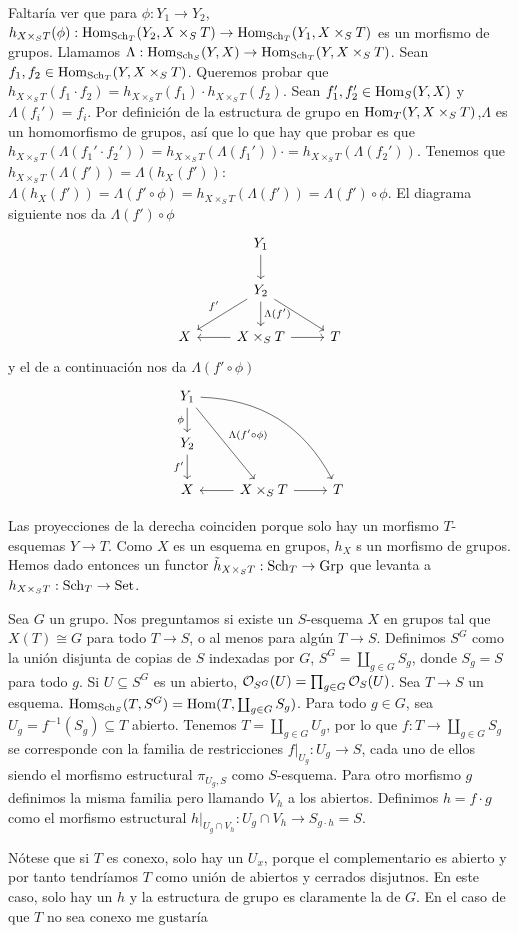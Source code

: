 \documentclass[GA.tex]{subfiles}
\begin{document}
Faltaría ver que para $\phi:Y_1\to Y_2$, $h_{X\times_S T}(\phi):\operatorname{Hom}_{\operatorname{Sch}_T}(Y_2,X\times_S T)\to\operatorname{Hom}_{\operatorname{Sch}_T}(Y_1,X\times_S T)$ es un morfismo de grupos. 
Llamamos $\Lambda:\operatorname{Hom}_{\operatorname{Sch}_S}(Y,X)\to\operatorname{Hom}_{\operatorname{Sch}_T}(Y,X\times_S T)$. Sean $f_1,f_2\in\operatorname{Hom}_{\operatorname{Sch}_T}(Y,X\times_S T)$. Queremos probar que $h_{X\times_S T}(f_1\cdot f_2)=h_{X\times_S T}(f_1)\cdot h_{X\times_S T}(f_2)$. Sean $f_1',f_2'\in\operatorname{Hom}_S(Y,X)$ y $\Lambda(f_i')=f_i$. Por definición de la estructura de grupo en $\operatorname{Hom}_T(Y,X\times_S T)$,$\Lambda$ es un homomorfismo de grupos, así que lo que hay que probar es que $h_{X\times_S T}(\Lambda(f_1'\cdot f_2'))=h_{X\times_S T}(\Lambda(f_1'))\cdot=h_{X\times_S T}(\Lambda(f_2'))$. Tenemos que $h_{X\times_S T}(\Lambda(f'))=\Lambda(h_X(f'))$: $\Lambda(h_X(f'))=\Lambda(f'\circ\phi)=h_{X\times_S T}(\Lambda(f'))=\Lambda(f')\circ\phi$. El diagrama siguiente nos da $\Lambda(f')\circ\phi$
\[
\begin{tikzcd}
 & Y_1 \arrow[d] &  \\
 & Y_2 \arrow[ld, "f'"'] \arrow[rd] \arrow[d, "\Lambda(f')"] &  \\
X & X\times_ST \arrow[l] \arrow[r] & T
\end{tikzcd}
\]
y el de a continuación nos da $\Lambda(f'\circ\phi)$
\[
\begin{tikzcd}
Y_1 \arrow[d, "\phi"'] \arrow[rdd, "\Lambda(f'\circ\phi)"] \arrow[rrdd, bend left] &  &  \\
Y_2 \arrow[d, "f'"'] &  &  \\
X & X\times_S T \arrow[l] \arrow[r] & T
\end{tikzcd}
\]

Las proyecciones de la derecha coinciden porque solo hay un morfismo $T$-esquemas $Y\to T$. Como $X$ es un esquema en grupos, $h_X$ s un morfismo de grupos. Hemos dado entonces un functor $\tilde{h}_{X\times_S T}:\operatorname{Sch}_T\to\operatorname{Grp}$ que levanta a $h_{X\times_S T}:\operatorname{Sch}_T\to\operatorname{Set}$. 




\begin{ej}
Sea $G$ un grupo. Nos preguntamos si existe un $S$-esquema $X$ en grupos tal que $X(T)\cong G$ para todo $T\to S$, o al menos para algún $T\to S$. Definimos $S^G$ como la unión disjunta de copias de $S$ indexadas por $G$, $S^G=\coprod_{g\in G}S_g$, donde $S_g=S$ para todo $g$. Si $U\subseteq S^G$ es un abierto, ${\mathcal O}_{S^G}(U)=\prod_{g\in G}{\mathcal O}_S(U)$. Sea $T\to S$ un esquema. $\operatorname{Hom}_{\operatorname{Sch}_S}(T,S^G)=\operatorname{Hom}(T,\coprod_{g\in G}S_g)$. Para todo $g\in G$, sea $U_g=f^{-1}(S_g)\subseteq T$ abierto. Tenemos $T=\coprod_{g\in G} U_g$, por lo que $f:T\to\coprod_{g\in G}S_g$ se corresponde con la familia de restricciones $f|_{U_g}:U_g\to S$, cada uno de ellos siendo el morfismo estructural $\pi_{U_g,S}$ como $S$-esquema. Para otro morfismo $g$ definimos la misma familia pero llamando $V_h$ a los abiertos. Definimos $h=f\cdot g$ como el morfismo estructural $h|_{U_g\cap V_h}:U_g\cap V_h\to S_{g\cdot h}=S$.

Nótese que si $T$ es conexo, solo hay un $U_x$, porque el complementario es abierto y por tanto tendríamos $T$ como unión de abiertos y cerrados disjutnos. En este caso, solo hay un $h$ y la estructura de grupo es claramente la de $G$. En el caso de que $T$ no sea conexo me gustaría
\end{ej}
\end{document}
